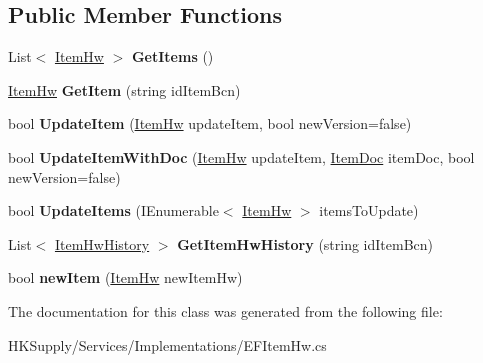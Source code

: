 \subsection*{Public Member Functions}
\begin{DoxyCompactItemize}
\item 
\mbox{\label{class_h_k_supply_1_1_services_1_1_implementations_1_1_e_f_item_hw_aab56fb48e4563624a6d4012209a72815}} 
List$<$ \mbox{\hyperlink{class_h_k_supply_1_1_models_1_1_item_hw}{Item\+Hw}} $>$ {\bfseries Get\+Items} ()
\item 
\mbox{\label{class_h_k_supply_1_1_services_1_1_implementations_1_1_e_f_item_hw_a535581f5288aed527461609a7432e839}} 
\mbox{\hyperlink{class_h_k_supply_1_1_models_1_1_item_hw}{Item\+Hw}} {\bfseries Get\+Item} (string id\+Item\+Bcn)
\item 
\mbox{\label{class_h_k_supply_1_1_services_1_1_implementations_1_1_e_f_item_hw_ab787e4862acb8d11a120b17d9d796042}} 
bool {\bfseries Update\+Item} (\mbox{\hyperlink{class_h_k_supply_1_1_models_1_1_item_hw}{Item\+Hw}} update\+Item, bool new\+Version=false)
\item 
\mbox{\label{class_h_k_supply_1_1_services_1_1_implementations_1_1_e_f_item_hw_afb29a610adfcda7de92d690a2e4f683d}} 
bool {\bfseries Update\+Item\+With\+Doc} (\mbox{\hyperlink{class_h_k_supply_1_1_models_1_1_item_hw}{Item\+Hw}} update\+Item, \mbox{\hyperlink{class_h_k_supply_1_1_models_1_1_item_doc}{Item\+Doc}} item\+Doc, bool new\+Version=false)
\item 
\mbox{\label{class_h_k_supply_1_1_services_1_1_implementations_1_1_e_f_item_hw_a17dbd9d12d503cb1d6c379b375e70376}} 
bool {\bfseries Update\+Items} (I\+Enumerable$<$ \mbox{\hyperlink{class_h_k_supply_1_1_models_1_1_item_hw}{Item\+Hw}} $>$ items\+To\+Update)
\item 
\mbox{\label{class_h_k_supply_1_1_services_1_1_implementations_1_1_e_f_item_hw_ad1c8379d35a1d1ab623b2fe01206eb8c}} 
List$<$ \mbox{\hyperlink{class_h_k_supply_1_1_models_1_1_item_hw_history}{Item\+Hw\+History}} $>$ {\bfseries Get\+Item\+Hw\+History} (string id\+Item\+Bcn)
\item 
\mbox{\label{class_h_k_supply_1_1_services_1_1_implementations_1_1_e_f_item_hw_a32711e302ff6cd9c74c04c1697a37499}} 
bool {\bfseries new\+Item} (\mbox{\hyperlink{class_h_k_supply_1_1_models_1_1_item_hw}{Item\+Hw}} new\+Item\+Hw)
\end{DoxyCompactItemize}


The documentation for this class was generated from the following file\+:\begin{DoxyCompactItemize}
\item 
H\+K\+Supply/\+Services/\+Implementations/E\+F\+Item\+Hw.\+cs\end{DoxyCompactItemize}

